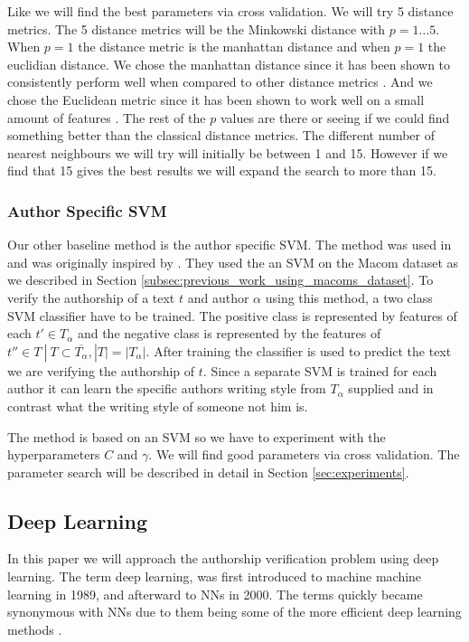 Like \citet{US} we will find the best parameters via cross validation. We will
try 5 distance metrics. The 5 distance metrics will be the Minkowski distance
with $p = 1 \dots 5$. When $p = 1$ the distance metric is the manhattan distance
and when $p = 1$ the euclidian distance. We chose the manhattan distance since
it has been shown to consistently perform well when compared to other distance
metrics \citep{evert2015towards}. And we chose the Euclidean metric since it has
been shown to work well on a small amount of features \citep{evert2015towards}.
The rest of the $p$ values are there or seeing if we could find something better
than the classical distance metrics. The different number of nearest neighbours
we will try will initially be between 1 and 15. However if we find that 15 gives
the best results we will expand the search to more than 15.


\subsubsection{Author Specific SVM}

Our other baseline method is the author specific \gls{SVM}. The method
was used in \citep{US} and was originally inspired by \citet{hansen2014}.
They used the an \gls{SVM} on the Macom dataset as we described in Section
\ref{subsec:previous_work_using_macoms_dataset}. To verify the authorship of a
text $t$ and author $\alpha$ using this method, a two class \gls{SVM} classifier
have to be trained. The positive class is represented by features of each $t'
\in T_\alpha$ and the negative class is represented by the features of $t''
\in T\ |\ T \subset \overline{T_\alpha}, |T| = |T_\alpha|$. After training the
classifier is used to predict the text we are verifying the authorship of $t$.
Since a separate \gls{SVM} is trained for each author it can learn the specific
authors writing style from $T_\alpha$ supplied and in contrast what the writing
style of someone not him is.

The method is based on an \gls{SVM} so we have to experiment with the
hyperparameters $C$ and $\gamma$. We will find good parameters via cross
validation. The parameter search will be described in detail in Section
\ref{sec:experiments}.


\subsection{Deep Learning}

In this paper we will approach the authorship verification problem using
deep learning. The term deep learning, was first introduced to machine machine
learning in 1989, and afterward to \glspl{NN} in 2000. The terms quickly became
synonymous with \glspl{NN} due to them being some of the more efficient deep
learning methods \citep{Schmidhuber:2015}.

